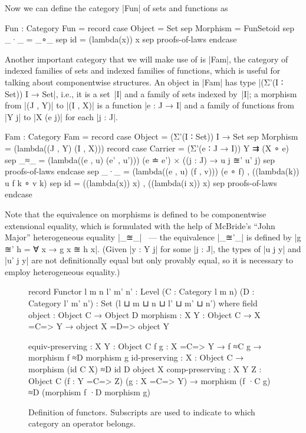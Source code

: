 Now we can define the category |Fun| of sets and functions as
\begin{code}
Fun : Category
Fun = record  case  Object    =  Set
              sep   Morphism  =  FunSetoid
              sep   _·_  =  _∘_
              sep   id   =  (lambda(x)) x
              sep   proofs-of-laws endcase
\end{code}
Another important category that we will make use of is |Fam|, the category of indexed families of sets and indexed families of functions, which is useful for talking about componentwise structures.
An object in |Fam| has type |(Σ'(I ∶ Set)) I → Set|, i.e., it is a set~|I| and a family of sets indexed by~|I|;
a morphism from |(J , Y)| to |(I , X)| is a function |e : J → I| and a family of functions from |Y j| to |X (e j)| for each |j : J|.
\begin{code}
Fam : Category
Fam = record
  case  Object    =  (Σ'(I ∶ Set)) I → Set
  sep   Morphism  =  (lambda((J , Y) (I , X))) record
                       case  Carrier  =  (Σ'(e ∶ J → I)) Y ⇉ (X ∘ e)
                       sep   _≈_      =  (lambda((e , u) (e' , u')))
                                           (e ≐ e') × ((j : J) → u {j} ≊' u' {j})
                       sep  proofs-of-laws endcase
  sep   _·_  = (lambda((e , u) (f , v))) (e ∘ f) , ((lambda({k})) u {f k} ∘ v {k})
  sep   id   =  ((lambda(x)) x) , ((lambda({i} x)) x)
  sep   proofs-of-laws endcase
\end{code}
Note that the equivalence on morphisms is defined to be componentwise extensional equality, which is formulated with the help of McBride's ``John Major'' heterogeneous equality |_≊_|~\citep{McBride-thesis} --- the equivalence |_≊'_| is defined by |g ≊' h = ∀ x → g x ≊ h x|.
(Given |y : Y j| for some |j : J|, the types of |u {j} y| and |u' {j} y| are not definitionally equal but only provably equal, so it is necessary to employ heterogeneous equality.)

\begin{figure}
\codefigure
\begin{code}
record Functor {l m n l' m' n' : Level}
  (C : Category {l} {m} {n}) (D : Category {l'} {m'} {n'}) :
  Set (l ⊔ m ⊔ n ⊔ l' ⊔ m' ⊔ n') where
  field
    object    :  Object C → Object D
    morphism  :  {X Y : Object C} → X =C=> Y → object X =D=> object Y

    equiv-preserving  :  {X Y : Object C} {f g : X =C=> Y} →
                         f ≈C g → morphism f ≈D morphism g
    id-preserving     :  {X : Object C} →
                         morphism (id C {X}) ≈D id D {object X}
    comp-preserving   :  {X Y Z : Object C} (f : Y =C=> Z) (g : X =C=> Y) →
                         morphism (f ·C g) ≈D (morphism f ·D morphism g)
\end{code}
\caption{Definition of functors. Subscripts are used to indicate to which category an operator belongs.}
\label{fig:functor}
\end{figure}

